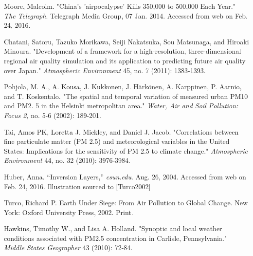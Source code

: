 \documentclass[11pt]{article} %
\begin{document}
\begin{thebibliography}{1}
Moore, Malcolm. "China's 'airpocalypse' Kills 350,000 to 500,000 Each Year." \textit{The Telegraph}. Telegraph Media Group, 07 Jan. 2014. Accessed from web on Feb. 24, 2016.

Chatani, Satoru, Tazuko Morikawa, Seiji Nakatsuka, Sou Matsunaga, and Hiroaki Minoura. "Development of a framework for a high-resolution, three-dimensional regional air quality simulation and its application to predicting future air quality over Japan." \textit{Atmospheric Environment} 45, no. 7 (2011): 1383-1393.

Pohjola, M. A., A. Kousa, J. Kukkonen, J. Härkönen, A. Karppinen, P. Aarnio, and T. Koskentalo. "The spatial and temporal variation of measured urban PM10 and PM2. 5 in the Helsinki metropolitan area." \textit{Water, Air and Soil Pollution: Focus 2,} no. 5-6 (2002): 189-201.

Tai, Amos PK, Loretta J. Mickley, and Daniel J. Jacob. "Correlations between fine particulate matter (PM 2.5) and meteorological variables in the United States: Implications for the sensitivity of PM 2.5 to climate change." \textit{Atmospheric Environment} 44, no. 32 (2010): 3976-3984.

 Huber, Anna. ``Inversion Layers,'' \textit{csun.edu}. Aug. 26, 2004. Accessed from web on Feb. 24, 2016. 
Illustration sourced to [Turco2002]

Turco, Richard P. Earth Under Siege: From Air Pollution to Global Change. New York: Oxford University Press, 2002. Print.

Hawkins, Timothy W., and Lisa A. Holland. "Synoptic and local weather conditions associated with PM2.5 concentration in Carlisle, Pennsylvania." \textit{Middle States Geographer} 43 (2010): 72-84.



\end{thebibliography}
\end{document}
